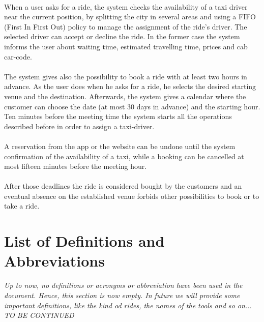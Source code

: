 \documentclass[\mainpath/main]{subfiles}
\begin{document}
 \\
 When a user asks for a ride, the system checks the availability of a taxi driver near the current position, by splitting the city in several areas and using a FIFO (First In First Out) policy to manage the assignment of the ride's driver. The selected driver can accept or decline the ride. In the former case the system informs the user about waiting time, estimated travelling time, prices and cab car-code. \\
 \\
 The system gives also the possibility to book a ride with at least two hours in advance. As the user does when he asks for a ride, he selects the desired starting venue and the destination. Afterwards, the system gives a calendar where the customer can choose the date (at most 30 days in advance) and the starting hour. Ten minutes before the meeting time the system starts all the operations described before in order to assign a taxi-driver.\\
 \\
 A reservation from the app or the website can be undone until the system confirmation of the availability of a taxi, while a booking can be cancelled at most fifteen minutes before the meeting hour.\\
 \\
 After those deadlines the ride is considered bought by the customers and an eventual absence on the established venue forbids other possibilities to book or to take a ride.

\section{List of Definitions and Abbreviations}
\label{Introduction:DefinitionsAndAbbrevations}
\textit{Up to now, no definitions or acronyms or abbreviation have been used in the document. Hence, this section is now empty.
In future we will provide some important definitions, like the kind od rides, the names of the tools and so on... TO BE CONTINUED}
\end{document}

